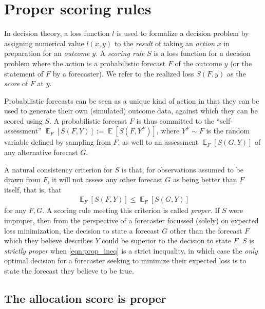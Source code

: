 \documentclass{article}\usepackage[]{graphicx}\usepackage[]{xcolor}
\DeclareMathOperator{\Ex}{\mathbb{E}}
\begin{document}
\section{Proper scoring rules}
\label{sec:a:proper}

In decision theory, a loss function $l$ is used to formalize a decision problem by assigning numerical value $l(x,y)$ to
the \emph{result} of taking an \emph{action} $x$ in preparation for an \emph{outcome} $y$. A \emph{scoring rule} $S$ is
a loss function for a decision problem where the action is a probabilistic forecast $F$ of the outcome $y$ (or the
statement of $F$ by a forecaster). We refer to the realized loss $S(F,y)$ as the \emph{score} of $F$ at $y$.

Probabilistic forecasts can be seen as a unique kind of action in that they can be used to generate their own
(simulated) outcome data, against which they can be scored using $S$. A probabilistic forecast $F$ is thus committed to
the ``self-assessment'' $\Ex_F [S(F, Y)] := \Ex [S(F, Y^F)]$, where $Y^F \sim F$ is the random variable defined by
sampling from $F$, as well to an assessment $\Ex_F [S(G, Y)]$ of any alternative forecast $G$.

A natural consistency criterion for $S$ is that, for observations assumed to be drawn from $F$, it will not assess any
other forecast $G$ as being better than $F$ itself, that is, that
\begin{align}
\Ex_F [S(F, Y)] \leq \Ex_F [S(G, Y)] \label{eqn:prop_ineq}
\end{align}
for any $F,G$. A scoring rule meeting this criterion is called \emph{proper}. If $S$ were improper, then from the
perspective of a forecaster focussed (solely) on expected loss minimization, the decision to state a forecast $G$ other
than the forecast $F$ which they believe describes $Y$ could be superior to the decision to state $F$. $S$ is
\emph{strictly proper} when \eqref{eqn:prop_ineq} is a strict inequality, in which case the \emph{only} optimal decision
for a forecaster seeking to minimize their expected loss is to state the forecast they believe to be true.

\subsection{The allocation score is proper}
\label{sec:a:alloscore_proper}
\end{document}
